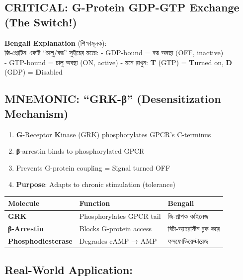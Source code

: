 \hypertarget{critical-g-protein-gdp-gtp-exchange-the-switch}{%
\subsection{\texorpdfstring{\textbf{CRITICAL: G-Protein GDP-GTP Exchange
(The
Switch!)}}{CRITICAL: G-Protein GDP-GTP Exchange (The Switch!)}}\label{critical-g-protein-gdp-gtp-exchange-the-switch}}

\textbf{Bengali Explanation} (শিক্ষামূলক):\\
জি-প্রোটিন একটি ``চালু/বন্ধ'' সুইচের মতো: - GDP-bound = বন্ধ অবস্থা (OFF,
inactive)\\
- GTP-bound = চালু অবস্থা (ON, active) - মনে রাখুন: \textbf{T} (GTP) =
\textbf{T}urned on, \textbf{D} (GDP) = \textbf{D}isabled

\hypertarget{mnemonic-grk-ux3b2-desensitization-mechanism}{%
\subsection{\texorpdfstring{\textbf{MNEMONIC: ``GRK-β'' (Desensitization
Mechanism)}}{MNEMONIC: ``GRK-β'' (Desensitization Mechanism)}}\label{mnemonic-grk-ux3b2-desensitization-mechanism}}

\begin{enumerate}
\def\labelenumi{\arabic{enumi}.}
\tightlist
\item
  \textbf{G}-Receptor \textbf{K}inase (GRK) phosphorylates GPCR's
  C-terminus
\item
  \textbf{β}-arrestin binds to phosphorylated GPCR
\item
  Prevents G-protein coupling = Signal turned OFF
\item
  \textbf{Purpose}: Adapts to chronic stimulation (tolerance)
\end{enumerate}

\begin{longtable}[]{@{}lll@{}}
\toprule\noalign{}
Molecule & Function & Bengali \\
\midrule\noalign{}
\endhead
\bottomrule\noalign{}
\endlastfoot
\textbf{GRK} & Phosphorylates GPCR tail & জি-প্রাপক কাইনেজ \\
\textbf{β-Arrestin} & Blocks G-protein access & বিটা-অ্যারেস্টিন ব্লক
করে \\
\textbf{Phosphodiesterase} & Degrades cAMP → AMP & ফসফোডিয়েস্টারেজ \\
\end{longtable}

\hypertarget{real-world-application}{%
\subsection{\texorpdfstring{\textbf{Real-World
Application}:}{Real-World Application:}}\label{real-world-application}}

